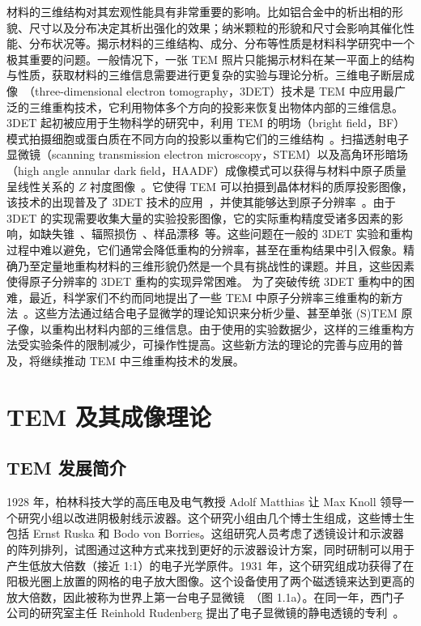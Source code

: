 材料的三维结构对其宏观性能具有非常重要的影响。比如铝合金中的析出相的形貌、尺寸以及分布决定其析出强化的效果；纳米颗粒的形貌和尺寸会影响其催化性能、分布状况等。揭示材料的三维结构、成分、分布等性质是材料科学研究中一个极其重要的问题。一般情况下，一张 TEM 照片只能揭示材料在某一平面上的结构与性质，获取材料的三维信息需要进行更复杂的实验与理论分析。三维电子断层成像~\cite{Frank2006,VanAarle2015,Heidari2013,Koning2013,Fakron2015}（three-dimensional electron tomography，3DET）技术是 TEM 中应用最广泛的三维重构技术，它利用物体多个方向的投影来恢复出物体内部的三维信息。3DET 起初被应用于生物科学的研究中，利用 TEM 的明场（bright field，BF）模式拍摄细胞或蛋白质在不同方向的投影以重构它们的三维结构~\cite{Baumeister1999,McEwen2001, McIntosh2001}。扫描透射电子显微镜（scanning transmission electron microscopy，STEM）以及高角环形暗场（high angle annular dark field，HAADF）成像模式可以获得与材料中原子质量呈线性关系的 $Z$ 衬度图像~\cite{Nellist2000}。它使得 TEM 可以拍摄到晶体材料的质厚投影图像，该技术的出现普及了 3DET 技术的应用~\cite{Kubel2005,Zhong2017,Alania2017,Lefebvre2015}，并使其能够达到原子分辨率~\cite{Zhou2019,Chen2013,Miao2016,Zhu2013,Xu2015,Scott2012,WangCY2020}。由于 3DET 的实现需要收集大量的实验投影图像，它的实际重构精度受诸多因素的影响，如缺失锥~\cite{Persson2001,Lu2010,Aganj2007,Paavolainen2014,Yau1996,Trampert2016,Kovacik2014,Kupsch2015}、辐照损伤~\cite{Lee2008}、样品漂移~\cite{Ress1999,Jones2013,Diez2006,Printemps2016}等。这些问题在一般的 3DET 实验和重构过程中难以避免，它们通常会降低重构的分辨率，甚至在重构结果中引入假象。精确乃至定量地重构材料的三维形貌仍然是一个具有挑战性的课题。并且，这些因素使得原子分辨率的 3DET 重构的实现异常困难。
为了突破传统 3DET 重构中的困难，最近，科学家们不约而同地提出了一些 TEM 中原子分辨率三维重构的新方法~\cite{ChenFR2017,ChenFR2016,Jia2014,VanDyck2012,VanAert2011}。这些方法通过结合电子显微学的理论知识来分析少量、甚至单张 (S)TEM 原子像，以重构出材料内部的三维信息。由于使用的实验数据少，这样的三维重构方法受实验条件的限制减少，可操作性提高。这些新方法的理论的完善与应用的普及，将继续推动 TEM 中三维重构技术的发展。


\section{TEM 及其成像理论}
\subsection{TEM 发展简介}
1928 年，柏林科技大学的高压电及电气教授 Adolf Matthias 让 Max Knoll 领导一个研究小组以改进阴极射线示波器。这个研究小组由几个博士生组成，这些博士生包括 Ernst Ruska 和 Bodo von Borries。这组研究人员考虑了透镜设计和示波器的阵列排列，试图通过这种方式来找到更好的示波器设计方案，同时研制可以用于产生低放大倍数（接近 1:1）的电子光学原件。1931 年，这个研究组成功获得了在阳极光圈上放置的网格的电子放大图像。这个设备使用了两个磁透镜来达到更高的放大倍数，因此被称为世界上第一台电子显微镜~\cite{Knoll1932}（图 1.1a）。在同一年，西门子公司的研究室主任 Reinhold Rudenberg 提出了电子显微镜的静电透镜的专利~\cite{RudenbergReinhold1931}。

